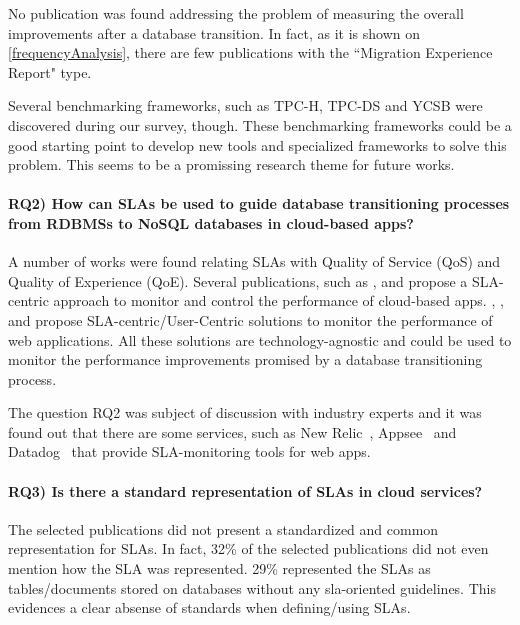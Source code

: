 \documentclass{article}
\begin{document}
{{No publication was found addressing the problem of measuring the overall improvements after a database transition. In fact, as it is shown on \ref{frequencyAnalysis}, there are few publications with the ``Migration Experience Report"  type. 

Several benchmarking frameworks, such as TPC-H, TPC-DS and YCSB were discovered\cite{6616442} during our survey, though. These benchmarking frameworks could be a good starting point to develop new tools and specialized frameworks to solve this problem. This seems to be a promissing research theme for future works.

\paragraph*{\textbf{RQ2)} How can SLAs be used to guide database transitioning processes from RDBMSs to NoSQL databases in cloud-based apps? }

A number of works were found relating SLAs with Quality of Service (QoS) and Quality of Experience (QoE). Several publications, such as \cite{Xiong:2012:DMR:2213598.2213614}, \cite{Konstantinou:2012:TEN:2213836.2213943} and \cite{Klems:2012:RQM:2477172.2477488} propose a SLA-centric approach to monitor and control the performance of cloud-based apps. 
\cite{6253526}, \cite{6461875}, \cite{6511780} and \cite{Xiong:2011:APA:2038916.2038931} propose SLA-centric/User-Centric solutions to monitor the performance of web applications. All these solutions are technology-agnostic and could be used to monitor the performance improvements promised by a database transitioning process.

The question RQ2 was subject of discussion with industry experts and it was found out that there are some services, such as New Relic~\cite{newrelic}, Appsee~\cite{appsee} and Datadog~\cite{datadog} that provide SLA-monitoring tools for web apps.


\paragraph*{\textbf{RQ3)} Is there a standard representation of SLAs in cloud services? }

The selected publications did not present a standardized and common representation for SLAs. In fact, 32\% of the selected publications did not even mention how the SLA was represented. 29\% represented the SLAs as tables/documents stored on databases without any sla-oriented guidelines. This evidences a clear absense of standards when defining/using SLAs.

}}
\end{document}
